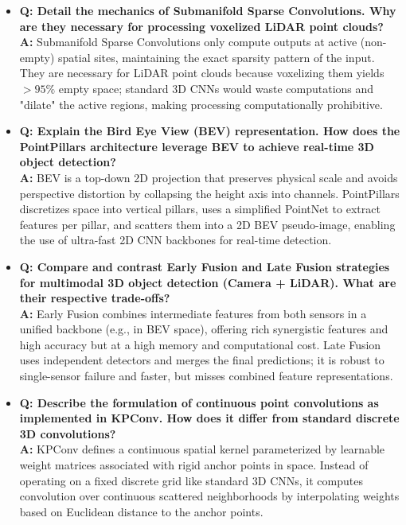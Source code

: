 \begin{itemize}
    \item \textbf{Q: Detail the mechanics of Submanifold Sparse Convolutions. Why are they necessary for processing voxelized LiDAR point clouds?} \\
    \textbf{A:} Submanifold Sparse Convolutions only compute outputs at active (non-empty) spatial sites, maintaining the exact sparsity pattern of the input. They are necessary for LiDAR point clouds because voxelizing them yields $>95\%$ empty space; standard 3D CNNs would waste computations and "dilate" the active regions, making processing computationally prohibitive.
    \item \textbf{Q: Explain the Bird Eye View (BEV) representation. How does the PointPillars architecture leverage BEV to achieve real-time 3D object detection?} \\
    \textbf{A:} BEV is a top-down 2D projection that preserves physical scale and avoids perspective distortion by collapsing the height axis into channels. PointPillars discretizes space into vertical pillars, uses a simplified PointNet to extract features per pillar, and scatters them into a 2D BEV pseudo-image, enabling the use of ultra-fast 2D CNN backbones for real-time detection.
    \item \textbf{Q: Compare and contrast Early Fusion and Late Fusion strategies for multimodal 3D object detection (Camera + LiDAR). What are their respective trade-offs?} \\
    \textbf{A:} Early Fusion combines intermediate features from both sensors in a unified backbone (e.g., in BEV space), offering rich synergistic features and high accuracy but at a high memory and computational cost. Late Fusion uses independent detectors and merges the final predictions; it is robust to single-sensor failure and faster, but misses combined feature representations.
    \item \textbf{Q: Describe the formulation of continuous point convolutions as implemented in KPConv. How does it differ from standard discrete 3D convolutions?} \\
    \textbf{A:} KPConv defines a continuous spatial kernel parameterized by learnable weight matrices associated with rigid anchor points in space. Instead of operating on a fixed discrete grid like standard 3D CNNs, it computes convolution over continuous scattered neighborhoods by interpolating weights based on Euclidean distance to the anchor points.
\end{itemize}
